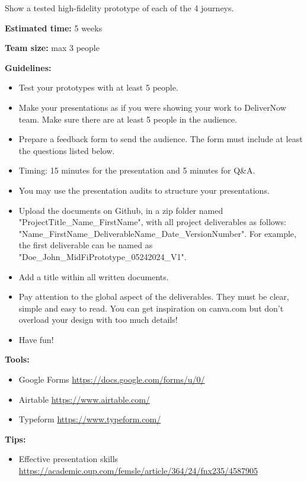 \makeheaderfiles

Show a tested high-fidelity prototype of each of the 4 journeys.

\textbf{Estimated time:} 5 weeks

\textbf{Team size:} max 3 people

\textbf{Guidelines:}

\begin{itemize}
\item Test your prototypes with at least 5 people.
\item Make your presentations as if you were showing your work to DeliverNow team. Make sure there are at least 5 people in the audience.
\item Prepare a feedback form to send the audience. The form must include at least the questions listed below.
\item Timing: 15 minutes for the presentation and 5 minutes for Q\&A.
\item You may use the presentation audits to structure your presentations.
\item Upload the documents on Github, in a zip folder named "ProjectTitle\_Name\_FirstName", with all project deliverables as follows: "Name\_FirstName\_DeliverableName\_Date\_VersionNumber".  For example, the first deliverable can be named as "Doe\_John\_MidFiPrototype\_05242024\_V1".
\item Add a title within all written documents.
\item Pay attention to the global aspect of the deliverables. They must be clear, simple and easy to read. You can get inspiration on canva.com but don't overload your design with too much details!
\item Have fun!
\end{itemize}

\textbf{Tools:}

\begin{itemize}
\item Google Forms \url{https://docs.google.com/forms/u/0/}
\item Airtable \url{https://www.airtable.com/}
\item Typeform \url{https://www.typeform.com/}
\end{itemize}

\textbf{Tips:}

\begin{itemize}
\item Effective presentation skills \url{https://academic.oup.com/femsle/article/364/24/fnx235/4587905}
\end{itemize}

